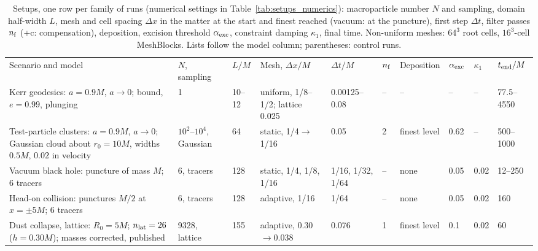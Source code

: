 \begin{table}
\caption{Setups, one row per family of runs (numerical settings in Table~\ref{tab:setups_numerics}): macroparticle number $N$ and sampling, domain half-width $L$, mesh and cell spacing $\Delta x$ in the matter at the start and finest reached (vacuum: at the puncture), first step $\Delta t$, filter passes $n_{\rm f}$ (+c: compensation), deposition, excision threshold $\alpha_{\rm exc}$, constraint damping $\kappa_1$, final time. Non-uniform meshes: $64^3$ root cells, $16^3$-cell MeshBlocks. Lists follow the model column; parentheses: control runs.}
\label{tab:setups}
\scriptsize
\setlength{\tabcolsep}{2pt}
\begin{ruledtabular}
\begin{tabular}{p{}p{}p{}p{}p{}p{}p{}p{}p{}p{}}
\raggedright Scenario and model & \raggedright $N$, sampling & \raggedright $L/M$ & \raggedright Mesh, $\Delta x/M$ & \raggedright $\Delta t/M$ & \raggedright $n_{\rm f}$ & \raggedright Deposition & \raggedright $\alpha_{\rm exc}$ & \raggedright $\kappa_1$ & \raggedright $t_{\rm end}/M$ \tabularnewline
\colrule
\raggedright Kerr geodesics: $a=0.9M$, $a\to0$; bound, $e=0.99$, plunging & \raggedright 1 & \raggedright 10--12 & \raggedright uniform, 1/8--1/2; lattice 0.025 & \raggedright 0.00125--0.08 & \raggedright -- & \raggedright -- & \raggedright -- & \raggedright -- & \raggedright 77.5--4550 \tabularnewline
\raggedright Test-particle clusters: $a=0.9M$, $a\to0$; Gaussian cloud about $r_0=10M$, widths $0.5M$, $0.02$ in velocity & \raggedright $10^2$--$10^4$, Gaussian & \raggedright 64 & \raggedright static, 1/4$\to$1/16 & \raggedright 0.05 & \raggedright 2 & \raggedright finest level & \raggedright 0.62 & \raggedright -- & \raggedright 500--1000 \tabularnewline
\raggedright Vacuum black hole: puncture of mass $M$; 6 tracers & \raggedright 6, tracers & \raggedright 128 & \raggedright static, 1/4, 1/8, 1/16 & \raggedright 1/16, 1/32, 1/64 & \raggedright -- & \raggedright none & \raggedright 0.05 & \raggedright 0.02 & \raggedright 12--250 \tabularnewline
\raggedright Head-on collision: punctures $M/2$ at $x=\pm5M$; 6 tracers & \raggedright 6, tracers & \raggedright 128 & \raggedright adaptive, 1/16 & \raggedright 1/64 & \raggedright -- & \raggedright none & \raggedright 0.05 & \raggedright 0.02 & \raggedright 160 \tabularnewline
\raggedright Dust collapse, lattice: $R_0=5M$; $n_{\rm lat}=26$ ($h=0.30M$); masses corrected, published & \raggedright 9328, lattice & \raggedright 155 & \raggedright adaptive, 0.30$\to$0.038 & \raggedright 0.076 & \raggedright 1 & \raggedright finest level & \raggedright 0.1 & \raggedright 0.02 & \raggedright 60 \tabularnewline

\end{tabular}
\end{ruledtabular}
\end{table}
